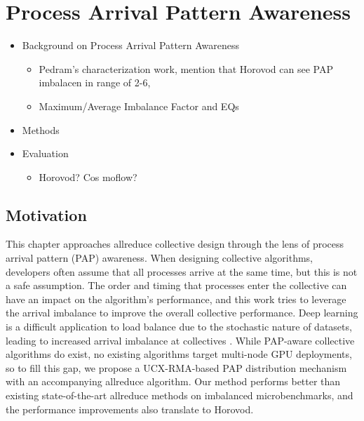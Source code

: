 
\chapter[Process Arrival Pattern Awareness]{Process Arrival Pattern Awareness}\label{ch:PAPAwareness}

\begin{itemize}
    \item Background on Process Arrival Pattern Awareness
    \begin{itemize}
        \item Pedram's characterization work, mention that Horovod can see PAP imbalacen in range of 2-6, \cite{Alizadeh2022PAPCollDL, Mohammadalizadehbakhtevari2021Thesis}
        \item Maximum/Average Imbalance Factor and EQs
    \end{itemize}
    \item Methods
    \item Evaluation
    \begin{itemize}
        \item Horovod? Cos  moflow?
    \end{itemize}
\end{itemize}

\section{Motivation}

This chapter approaches allreduce collective design through the lens of process arrival pattern (PAP) awareness. 
When designing collective algorithms, developers often assume that all processes arrive at the same time, but this is not a safe assumption.
The order and timing that processes enter the collective can have an impact on the algorithm's performance, and this work tries to leverage the arrival imbalance to improve the overall collective performance.
Deep learning is a difficult application to load balance due to the stochastic nature of datasets, leading to increased arrival imbalance at collectives \cite{Mohammadalizadehbakhtevari2021Thesis, Alizadeh2022PAPCollDL, Li2020DLPartialColl}. 
While PAP-aware collective algorithms do exist, no existing algorithms target multi-node GPU deployments, so to fill this gap, we propose a UCX-RMA-based PAP distribution mechanism with an accompanying allreduce algorithm.
Our method performs better than existing state-of-the-art allreduce methods on imbalanced microbenchmarks, and the performance improvements also translate to Horovod.

